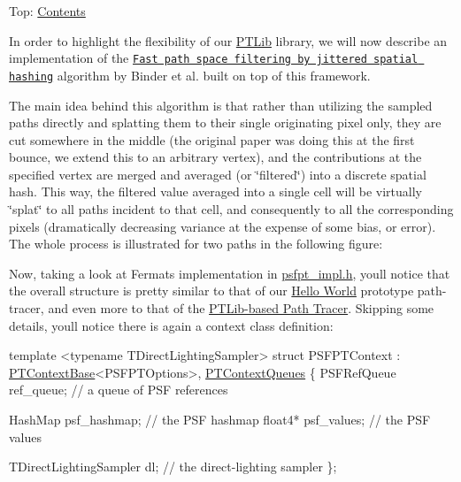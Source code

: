 Top\+: \hyperlink{_overture_contents_page}{Contents}

\begin{DoxyParagraph}{}
In order to highlight the flexibility of our \hyperlink{group___p_t_lib}{P\+T\+Lib} library, we will now describe an implementation of the \href{https://dl.acm.org/citation.cfm?id=3214806}{\tt Fast path space filtering by jittered spatial hashing} algorithm by Binder et al. built on top of this framework. 
\end{DoxyParagraph}
\begin{DoxyParagraph}{}
The main idea behind this algorithm is that rather than utilizing the sampled paths directly and splatting them to their single originating pixel only, they are cut somewhere in the middle (the original paper was doing this at the first bounce, we extend this to an arbitrary vertex), and the contributions at the specified vertex are merged and averaged (or \char`\"{}filtered\char`\"{}) into a discrete spatial hash. This way, the filtered value averaged into a single cell will be virtually \char`\"{}splat\char`\"{} to all paths incident to that cell, and consequently to all the corresponding pixels (dramatically decreasing variance at the expense of some bias, or error). The whole process is illustrated for two paths in the following figure\+:  
\end{DoxyParagraph}
\begin{DoxyParagraph}{}
Now, taking a look at Fermat\textquotesingle{}s implementation in \hyperlink{_p_s_f_p_t_page_code}{psfpt\+\_\+impl.\+h}, you\textquotesingle{}ll notice that the overall structure is pretty similar to that of our \hyperlink{_hello_renderer_page}{Hello World} prototype path-\/tracer, and even more to that of the \hyperlink{_p_t_page}{P\+T\+Lib-\/based Path Tracer}. Skipping some details, you\textquotesingle{}ll notice there is again a context class definition\+: ~\newline

\begin{DoxyCode}
\textcolor{keyword}{template} <\textcolor{keyword}{typename} TDirectLightingSampler>
\textcolor{keyword}{struct }PSFPTContext : \hyperlink{struct_p_t_context_base}{PTContextBase}<PSFPTOptions>, \hyperlink{struct_p_t_context_queues}{PTContextQueues}
\{
   PSFRefQueue ref\_queue;      \textcolor{comment}{// a queue of PSF references}

   HashMap     psf\_hashmap;    \textcolor{comment}{// the PSF hashmap}
   float4*     psf\_values;     \textcolor{comment}{// the PSF values}

   TDirectLightingSampler dl;  \textcolor{comment}{// the direct-lighting sampler}
\};
\end{DoxyCode}

\end{DoxyParagraph}

